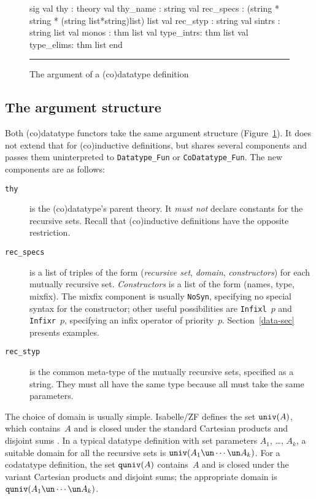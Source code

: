 \begin{figure}
\begin{ttbox}
sig
val thy       : theory
val thy_name  : string
val rec_specs : (string * string * (string list*string)list) list
val rec_styp  : string
val sintrs    : string list
val monos     : thm list
val type_intrs: thm list
val type_elims: thm list
end
\end{ttbox}
\hrule
\caption{The argument of a (co)datatype definition} \label{data-arg-fig}
\end{figure}

\subsection{The argument structure}
Both (co)datatype functors take the same argument structure
(Figure~\ref{data-arg-fig}).  It does not extend that for (co)inductive
definitions, but shares several components  and passes them uninterpreted to
\verb|Datatype_Fun| or \verb|CoDatatype_Fun|.  The new components are as
follows: 
\begin{description}
\item[\tt thy] is the (co)datatype's parent theory. It {\it must not\/}
declare constants for the recursive sets.  Recall that (co)inductive
definitions have the opposite restriction.

\item[\tt rec\_specs] is a list of triples of the form ({\it recursive set\/},
{\it domain\/}, {\it constructors\/}) for each mutually recursive set.  {\it
Constructors\/} is a list of the form (names, type, mixfix).  The mixfix
component is usually {\tt NoSyn}, specifying no special syntax for the
constructor; other useful possibilities are {\tt Infixl}~$p$ and {\tt
  Infixr}~$p$, specifying an infix operator of priority~$p$.
Section~\ref{data-sec} presents examples.

\item[\tt rec\_styp] is the common meta-type of the mutually recursive sets,
specified as a string.  They must all have the same type because all must
take the same parameters.
\end{description}
The choice of domain is usually simple.  Isabelle/ZF defines the set
$\hbox{\tt univ}(A)$, which contains~$A$ and is closed under the standard Cartesian
products and disjoint sums \cite[\S4.2]{paulson-set-II}.  In a typical
datatype definition with set parameters $A_1$, \ldots, $A_k$, a suitable
domain for all the recursive sets is $\univ(A_1\un\cdots\un A_k)$.  For a
codatatype definition, the set
$\hbox{\tt quniv}(A)$ contains~$A$ and is closed under the variant Cartesian products
and disjoint sums; the appropriate domain is
$\quniv(A_1\un\cdots\un A_k)$.

